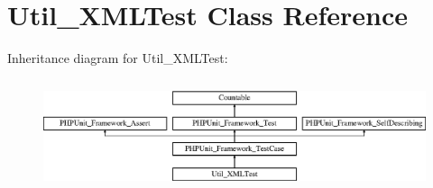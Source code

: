 \section{Util\+\_\+\+X\+M\+L\+Test Class Reference}
\label{class_util___x_m_l_test}
Inheritance diagram for Util\+\_\+\+X\+M\+L\+Test\+:\begin{figure}[H]
\begin{center}
\leavevmode
\includegraphics[height=3.303835cm]{class_util___x_m_l_test}
\end{center}
\end{figure}
